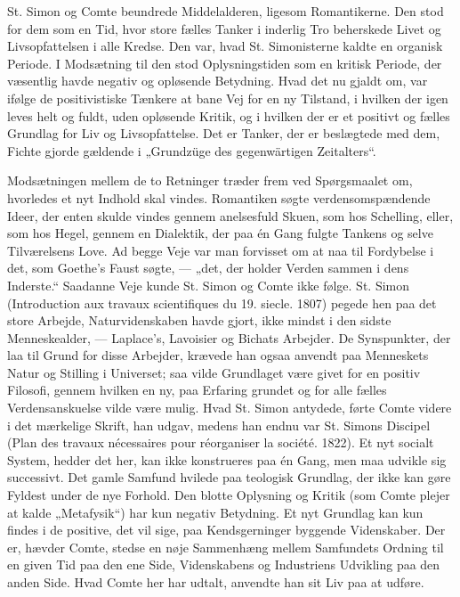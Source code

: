 \documentclass[12pt,a4paper,openany]{book}
\newcommand{\opage}[1]{\marginnote{\footnotesize\textit{[#1]}}}
\begin{document}
St. Simon og Comte beundrede Middelalderen, ligesom Romantikerne.
Den stod for dem som en Tid, hvor store fælles Tanker i
inderlig Tro beherskede Livet og Livsopfattelsen i alle Kredse. Den
var, hvad St. Simonisterne kaldte en organisk Periode. I Modsætning
til den stod Oplysningstiden som en kritisk Periode, der væsentlig
havde negativ og opløsende Betydning. Hvad det nu gjaldt om, var
ifølge de positivistiske Tænkere at bane Vej for en ny Tilstand, i
hvilken der igen leves helt og fuldt, uden opløsende Kritik, og i hvilken
der er et positivt og fælles Grundlag for Liv og Livsopfattelse.
Det er Tanker, der er beslægtede med dem, Fichte gjorde gældende
i „Grundzüge des gegenwärtigen Zeitalters“.

Modsætningen mellem de to Retninger træder frem ved Spørgsmaalet
om, hvorledes et nyt Indhold skal vindes. Romantiken søgte
verdensomspændende Ideer, der enten skulde vindes gennem anelsesfuld
Skuen, som hos Schelling, eller, som hos Hegel, gennem en
Dialektik, der paa én Gang fulgte Tankens og selve Tilværelsens Love.
Ad begge Veje var man forvisset om at naa til Fordybelse i det, som
Goethe’s Faust søgte, --- „det, der holder Verden sammen i dens
Inderste.“ Saadanne Veje kunde St. Simon og Comte ikke følge. St.
Simon (Introduction aux travaux scientifiques du 19. siecle. 1807)
pegede hen paa det store Arbejde, Naturvidenskaben havde gjort,
ikke mindst i den sidste Menneskealder, --- Laplace’s, Lavoisier og
Bichats Arbejder. De Synspunkter, der laa til Grund for disse Arbejder,
krævede han ogsaa anvendt paa Menneskets Natur og Stilling
\opage{16}i Universet; saa vilde Grundlaget være givet for en positiv Filosofi,
gennem hvilken en ny, paa Erfaring grundet og for alle fælles Verdensanskuelse
vilde være mulig. Hvad St. Simon antydede, førte
Comte videre i det mærkelige Skrift, han udgav, medens han endnu
var St. Simons Discipel (Plan des travaux nécessaires pour réorganiser
la société. 1822). Et nyt socialt System, hedder det her, kan
ikke konstrueres paa én Gang, men maa udvikle sig successivt. Det
gamle Samfund hvilede paa teologisk Grundlag, der ikke kan gøre
Fyldest under de nye Forhold. Den blotte Oplysning og Kritik (som
Comte plejer at kalde „Metafysik“) har kun negativ Betydning. Et
nyt Grundlag kan kun findes i de positive, det vil sige, paa Kendsgerninger
byggende Videnskaber. Der er, hævder Comte, stedse en
nøje Sammenhæng mellem Samfundets Ordning til en given Tid paa
den ene Side, Videnskabens og Industriens Udvikling paa den anden
Side. Hvad Comte her har udtalt, anvendte han sit Liv paa at udføre.
\end{document}
